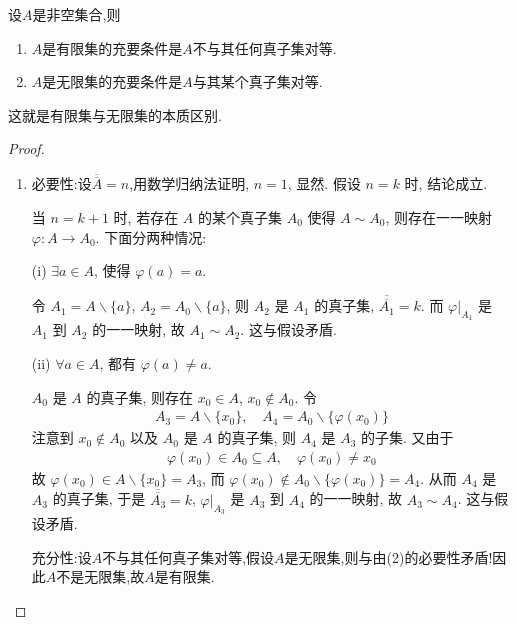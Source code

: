 \documentclass[../../main.tex]{subfiles}%
\begin{document}
\begin{theorem}
设$A$是非空集合,则
\begin{enumerate}[(1)]
\item $A$是有限集的充要条件是$A$不与其任何真子集对等.

\item $A$是无限集的充要条件是$A$与其某个真子集对等.
\end{enumerate}
\end{theorem}
\begin{note}
这就是有限集与无限集的本质区别.
\end{note}
\begin{proof}
\begin{enumerate}[(1)]
\item {\heiti 必要性:}设$\overline{\overline{A}} = n$,用数学归纳法证明, $n = 1$, 显然. 假设 $n = k$ 时, 结论成立.

当 $n = k + 1$ 时, 若存在 $A$ 的某个真子集 $A_0$ 使得 $A \sim A_0$, 则存在一一映射 $\varphi : A \to A_0$. 下面分两种情况:

(i) $\exists a \in A$, 使得 $\varphi(a) = a$.

令 $A_1 = A\backslash  \{a\}$, $A_2 = A_0\backslash  \{a\}$, 则 $A_2$ 是 $A_1$ 的真子集, $\overline{\overline{A_1}} = k$. 而 $\varphi|_{A_1}$ 是 $A_1$ 到 $A_2$ 的一一映射, 故 $A_1 \sim A_2$. 这与假设矛盾.

(ii) $\forall a \in A$, 都有 $\varphi(a) \neq a$.

$A_0$ 是 $A$ 的真子集, 则存在 $x_0 \in A$, $x_0 \notin A_0$. 令
\begin{align*}
A_3 = A\backslash  \{x_0\}, \quad A_4 = A_0\backslash  \{\varphi(x_0)\}
\end{align*}
注意到 $x_0 \notin A_0$ 以及 $A_0$ 是 $A$ 的真子集, 则 $A_4$ 是 $A_3$ 的子集. 又由于
\begin{align*}
\varphi(x_0) \in A_0 \subseteq A, \quad \varphi(x_0) \neq x_0
\end{align*}
故 $\varphi(x_0) \in A\backslash  \{x_0\} = A_3$, 而 $\varphi(x_0) \notin A_0\backslash  \{\varphi(x_0)\} = A_4$. 从而 $A_4$ 是 $A_3$ 的真子集, 于是 $\overline{\overline{A_3}} = k$, $\varphi|_{A_3}$ 是 $A_3$ 到 $A_4$ 的一一映射, 故 $A_3 \sim A_4$. 这与假设矛盾. 

{\heiti 充分性:}设$A$不与其任何真子集对等,假设$A$是无限集,则与由(2)的必要性矛盾!因此$A$不是无限集,故$A$是有限集.


\end{enumerate}
\end{proof}
\end{document}

